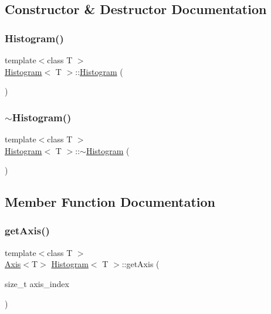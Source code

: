 \subsection{Constructor \& Destructor Documentation}
\mbox{\label{class_histogram_a28ba263b97aefe4da4c30acfe430bede}} 
\subsubsection{\texorpdfstring{Histogram()}{Histogram()}}
{\footnotesize\ttfamily template$<$class T $>$ \\
\hyperlink{class_histogram}{Histogram}$<$ T $>$\+::\hyperlink{class_histogram}{Histogram} (\begin{DoxyParamCaption}{ }\end{DoxyParamCaption})\hspace{0.3cm}{\ttfamily [default]}}

\mbox{\label{class_histogram_aa7885c184150b162950bf75408dafb33}} 
\subsubsection{\texorpdfstring{$\sim$\+Histogram()}{~Histogram()}}
{\footnotesize\ttfamily template$<$class T $>$ \\
\hyperlink{class_histogram}{Histogram}$<$ T $>$\+::$\sim$\hyperlink{class_histogram}{Histogram} (\begin{DoxyParamCaption}{ }\end{DoxyParamCaption})\hspace{0.3cm}{\ttfamily [default]}}



\subsection{Member Function Documentation}
\mbox{\label{class_histogram_a07d57444fc60e412e79137af9d87f0ff}} 
\subsubsection{\texorpdfstring{get\+Axis()}{getAxis()}}
{\footnotesize\ttfamily template$<$class T $>$ \\
\hyperlink{class_axis}{Axis}$<$T$>$ \hyperlink{class_histogram}{Histogram}$<$ T $>$\+::get\+Axis (\begin{DoxyParamCaption}\item[{size\+\_\+t}]{axis\+\_\+index }\end{DoxyParamCaption})\hspace{0.3cm}{\ttfamily [inline]}}

